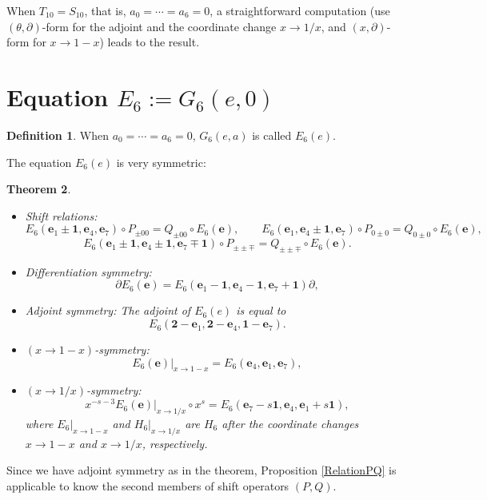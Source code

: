 \documentclass[a4paper,12pt]{article}
\newtheorem{thm}{Theorem}[section]  %
\theoremstyle{definition}
\newtheorem{dfn}[thm]{Definition}
\theoremstyle{remark}
\numberwithin{equation}{section} %
\def\comment#1{ }
\begin{document}
When $T_{10}=S_{10}$, that is, $a_0=\cdots=a_6=0$, a straightforward computation (use $(\theta,\partial)$-form for the adjoint and the coordinate change $x\to1/x$, and $(x,\partial)$-form for $x\to1-x$) leads to the result. 
\comment{In general we have only to notice that for ${\bm e}_{{\rm adj}}=({\bm 2}-{\bm e}_1,{\bm 2}-{\bm e}_4,{\bm 1}-{\bm e}_7),$
$$t_{2j}({\bm e}_{{\rm adj}})=t_{2j}({\bm e}),\ j=1,2,3,\qquad t_{3j}({\bm e}_{{\rm adj}})=-t_{3j}({\bm e}),\ j=4,5,6,$$
for ${\bm e}_{ch01}=({\bm e}_4,{\bm e}_1,{\bm e}_7$),
$$t_{i1}({\bm e}_{ch01})=t_{i2}({\bm e}),\ t_{i2}({\bm e}_{ch01})=t_{i1}({\bm e}),\ t_{i3}({\bm e}_{ch01})=t_{i3}({\bm e}),\ \ i=2,3,$$
for ${\bm e}_{ch0\infty}=({\bm e}_7-s{\bm1},{\bm e}_4,{\bm e}_1+s{\bm1})$,
$$t_{i1}({\bm e}_{ch0\infty})=t_{i3}({\bm e}),\ t_{i2}({\bm e}_{ch0\infty})=t_{i2}({\bm e}),\ t_{i3}({\bm e}_{ch0\infty})=t_{i1}({\bm e}),\ \ i=2,3.$$}

\section{Equation $E_6:=G_6(e,0)$}\secttoc
\begin{dfn}When $a_0=\cdots=a_6=0$, $G_6(e,a)$ is called $E_6(e)$.\end{dfn}
The equation $E_6(e)$ is very symmetric:%
\begin{thm}\label{symmetriesE6}\noindent
  \begin{itemize}[leftmargin=*] \setlength{\itemsep}{2pt}
  \item Shift relations:
  $$  E_6({\bm e}_1\pm{\bm 1},{\bm e}_4,{\bm e}_7)\circ P_{\pm00}=Q_{\pm00}\circ E_6({\bm e}),\qquad  E_6({\bm e}_1,{\bm e}_4\pm{\bm 1},{\bm e}_7)\circ P_{0\pm0}=Q_{0\pm0}\circ E_6({\bm e}),$$
$$  E_6({\bm e}_1\pm{\bm 1},{\bm e}_4\pm{\bm 1},{\bm e}_7\mp{\bm 1})\circ P_{\pm\pm\mp}=Q_{\pm\pm\mp}\circ E_6({\bm e}).$$
\item Differentiation symmetry: $$\partial E_6({\bm e})=E_6({\bm e}_1-{\bm 1},{\bm e}_4-{\bm 1},{\bm e}_7+{\bm 1})\partial,$$
\item Adjoint symmetry: The adjoint of $E_6(e)$ is equal to
   $$E_6({\bm 2}-{\bm e}_1,{\bm 2}-{\bm e}_4,{\bm 1}-{\bm e}_7).$$
\item $(x\to1-x)$-symmetry: $$E_6({\bm e})|_{x\to1-x}=E_6({\bm e}_4,{\bm e}_1,{\bm e}_7),$$
\item $(x\to1/x)$-symmetry: $$x^{-s-3}E_6({\bm e})|_{x\to1/x}\circ x^{s}=E_6({\bm e}_7-s{\bm1},{\bm e}_4,{\bm e}_1+s{\bm1}),$$
  where $E_6|_{x\to1-x}$ and $H_6|_{x\to1/x}$ are $H_6$ after the coordinate changes $x\to1-x$ and $x\to1/x$, respectively.
\end{itemize}
\end{thm}
Since we have adjoint symmetry as in the theorem, Proposition \ref{RelationPQ} is applicable to know the second members of shift operators $(P,Q)$.  %
\end{document}
